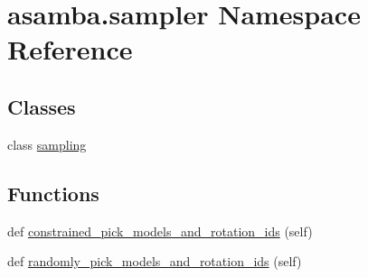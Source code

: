 \hypertarget{namespaceasamba_1_1sampler}{}\section{asamba.\+sampler Namespace Reference}
\label{namespaceasamba_1_1sampler}
\subsection*{Classes}
\begin{DoxyCompactItemize}
\item 
class \hyperlink{classasamba_1_1sampler_1_1sampling}{sampling}
\begin{DoxyCompactList}\small\item\em \paragraph*{}

\subsection*{}

\subsection*{}

\subsection*{}

\subsection*{}

\subsection*{}

\subparagraph*{}\end{DoxyCompactList}\end{DoxyCompactItemize}
\subsection*{Functions}
\begin{DoxyCompactItemize}
\item 
def \hyperlink{namespaceasamba_1_1sampler_a35fefd92d9be635fb89924a6778f9315}{constrained\+\_\+pick\+\_\+models\+\_\+and\+\_\+rotation\+\_\+ids} (self)
\item 
def \hyperlink{namespaceasamba_1_1sampler_a75d171190ae15adb0e2c6fabf2c04e7a}{randomly\+\_\+pick\+\_\+models\+\_\+and\+\_\+rotation\+\_\+ids} (self)
\end{DoxyCompactItemize}
